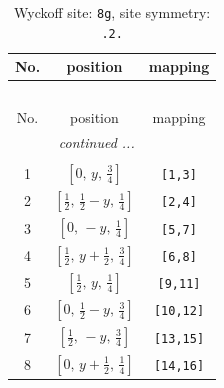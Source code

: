 \documentclass[fleqn,8pt]{jsarticle}
\begin{document}
\begin{longtable}{ccc}
\caption{Wyckoff site: {\tt 8g}, site symmetry: {\tt .2.}}
 \\
 \hline \hline
No. & position & mapping \\ \hline \endfirsthead

\multicolumn{2}{l}{\tablename\ \thetable{}} \\
 \hline \hline
No. & position & mapping \\ \hline \endhead

 \hline \hline
\multicolumn{2}{r}{\footnotesize\it continued ...} \\ \endfoot

 \hline \hline
\multicolumn{2}{r}{} \\ \endlastfoot

1 & $\left[ 0,\, y,\, \frac{3}{4} \right]$ & {\tt [1,3]} \\ \hline
2 & $\left[ \frac{1}{2},\, \frac{1}{2} - y,\, \frac{1}{4} \right]$ & {\tt [2,4]} \\ \hline
3 & $\left[ 0,\, - y,\, \frac{1}{4} \right]$ & {\tt [5,7]} \\ \hline
4 & $\left[ \frac{1}{2},\, y + \frac{1}{2},\, \frac{3}{4} \right]$ & {\tt [6,8]} \\ \hline
5 & $\left[ \frac{1}{2},\, y,\, \frac{1}{4} \right]$ & {\tt [9,11]} \\ \hline
6 & $\left[ 0,\, \frac{1}{2} - y,\, \frac{3}{4} \right]$ & {\tt [10,12]} \\ \hline
7 & $\left[ \frac{1}{2},\, - y,\, \frac{3}{4} \right]$ & {\tt [13,15]} \\ \hline
8 & $\left[ 0,\, y + \frac{1}{2},\, \frac{1}{4} \right]$ & {\tt [14,16]} \\
\end{longtable}
\renewcommand{\arraystretch}{1.2}
\end{document}
